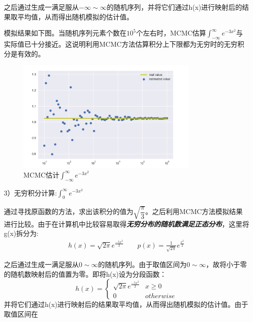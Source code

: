 \documentclass[paper=a4, fontsize=11pt]{scrartcl} %
\numberwithin{equation}{section} %
\numberwithin{figure}{section} %
\numberwithin{table}{section} %
\begin{document}
之后通过生成一满足服从$-\infty \sim \infty$的随机序列，并将它们通过h(x)进行映射后的结果取平均值，从而得出随机模拟的估计值。

模拟结果如下图。当随机序列元素个数在$10^{5}$个左右时，MCMC估算$\int_{-\infty}^{\infty}e^{-3x^2}$与实际值已十分接近。这说明利用MCMC方法估算积分上下限都为无穷时的无穷积分是有效的。
\begin{figure}[H]
	\centering
	\includegraphics[width = 0.8\textwidth]{quan.png}
	\caption{MCMC估计$\int_{-\infty}^{\infty}e^{-3x^2}$}
\end{figure}

\vspace{1cm}
3）无穷积分计算:\quad $\int_{0}^{\infty}e^{-3x^2}$

通过寻找原函数的方法，求出该积分的值为$\sqrt{\dfrac{\pi}{3}}$。之后利用MCMC方法模拟结果进行比较。由于在计算机中比较容易取得\emph{\textbf{无穷分布的随机数满足正态分布}}，这里将g(x)拆分为:
\begin{gather*}
h(x) = \sqrt{2\pi}e^{\frac{-5x^{2}}{2}} \qquad p(x) = \frac{1}{\sqrt{2\pi}} e^{\frac{x^{2}}{2}}
\end{gather*}

之后通过生成一满足服从$0 \sim \infty$的随机序列。由于取值区间为$0 \sim \infty$，故将小于零的随机数映射后的值置为零。即将h(x)设为分段函数：
\begin{equation}
	h(x) = 
	\begin{cases}
		\sqrt{2\pi}e^{\frac{-5x^{2}}{2}} & x \geq 0\\
		0 & otherwise
	\end{cases}
\end{equation}
并将它们通过h(x)进行映射后的结果取平均值，从而得出随机模拟的估计值。由于取值区间在
\end{document}
